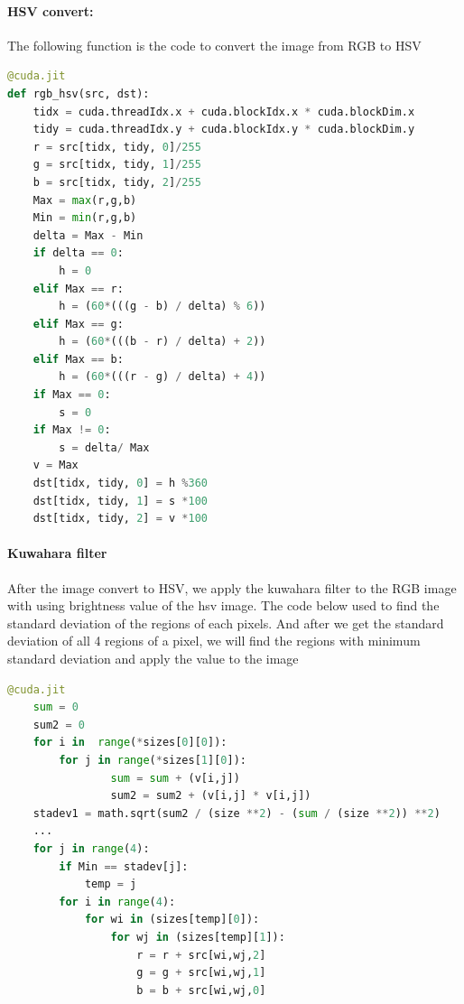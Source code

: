 \documentclass{article}
\begin{document}
\paragraph{HSV convert:} The following function is the code to convert the image from RGB to HSV
\begin{lstlisting}[language=Python]
@cuda.jit
def rgb_hsv(src, dst):
    tidx = cuda.threadIdx.x + cuda.blockIdx.x * cuda.blockDim.x
    tidy = cuda.threadIdx.y + cuda.blockIdx.y * cuda.blockDim.y
    r = src[tidx, tidy, 0]/255
    g = src[tidx, tidy, 1]/255
    b = src[tidx, tidy, 2]/255
    Max = max(r,g,b)
    Min = min(r,g,b)
    delta = Max - Min
    if delta == 0:
        h = 0
    elif Max == r:
        h = (60*(((g - b) / delta) % 6))
    elif Max == g:
        h = (60*(((b - r) / delta) + 2))
    elif Max == b: 
        h = (60*(((r - g) / delta) + 4))
    if Max == 0:
        s = 0
    if Max != 0:
        s = delta/ Max
    v = Max
    dst[tidx, tidy, 0] = h %360
    dst[tidx, tidy, 1] = s *100  
    dst[tidx, tidy, 2] = v *100
\end{lstlisting}

\paragraph{Kuwahara filter} 

\begin{figure}[H]
\end{figure}
After the image convert to HSV, we apply the kuwahara filter to the RGB image with using brightness value of the hsv image.
The code below used to find the standard deviation of the regions of each pixels. And after we get the standard deviation of all 4 regions of a pixel, we will find the regions with minimum standard deviation and apply the value to the image
\begin{lstlisting}[language=Python]
@cuda.jit
    sum = 0
    sum2 = 0
    for i in  range(*sizes[0][0]):
        for j in range(*sizes[1][0]):
                sum = sum + (v[i,j])
                sum2 = sum2 + (v[i,j] * v[i,j])
    stadev1 = math.sqrt(sum2 / (size **2) - (sum / (size **2)) **2)
    ...
    for j in range(4):
        if Min == stadev[j]:
            temp = j
        for i in range(4):
            for wi in (sizes[temp][0]):
                for wj in (sizes[temp][1]):
                    r = r + src[wi,wj,2]
                    g = g + src[wi,wj,1]
                    b = b + src[wi,wj,0]
\end{lstlisting}
\end{document}
